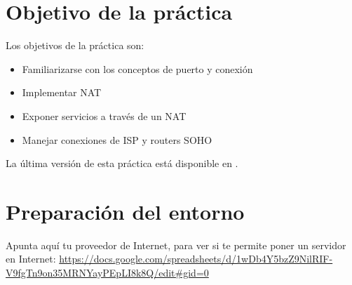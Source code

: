 
\usepackage{eurosym}


\renewcommand{\hmwkClass}{Planificación y Administración de Redes}
\renewcommand{\hmwkTitle}{Práctica de conexiones TCP}









\primerapagina

\setlength{\parindent}{0em}
\setlength{\parskip}{1em}


\section{Objetivo de la práctica}
Los objetivos  de la práctica son:
\begin{itemize}
\item Familiarizarse con los conceptos de puerto y conexión
\item Implementar NAT
\item Exponer servicios a través de un NAT  
\item Manejar conexiones de ISP y routers SOHO
\end{itemize}


La última versión de esta práctica está disponible en .


\section{Preparación del entorno}
Apunta aquí tu proveedor de Internet, para ver si te permite poner un servidor en Internet: {\footnotesize \url{https://docs.google.com/spreadsheets/d/1wDb4Y5bzZ9NilRIF-V9fgTn9on35MRNYayPEpLI8k8Q/edit#gid=0}}

